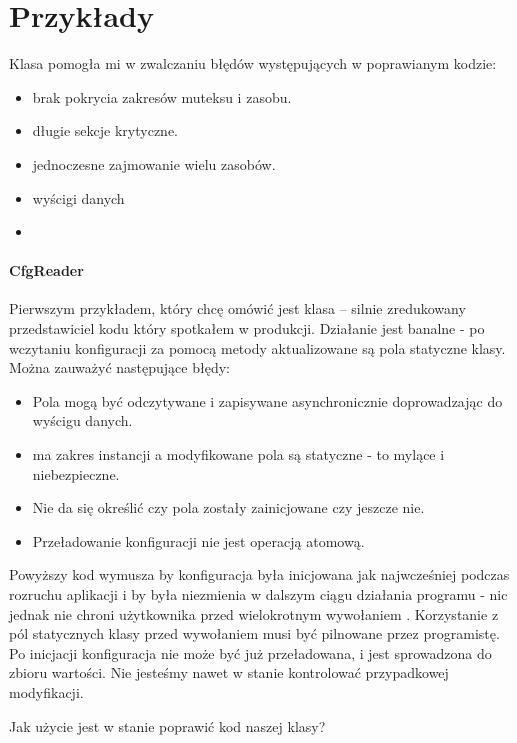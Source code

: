 \section{Przykłady}\label{sec:examples}
Klasa  pomogła mi w zwalczaniu błędów występujących w poprawianym kodzie:
\begin{itemize}
\item brak pokrycia zakresów muteksu i zasobu.
\item długie sekcje krytyczne.
\item jednoczesne zajmowanie wielu zasobów.
\item wyścigi danych
\item {}
\end{itemize}

\paragraph{CfgReader}
Pierwszym przykładem, który chcę omówić jest klasa  -- silnie zredukowany przedstawiciel kodu który spotkałem w produkcji. Działanie jest banalne - po wczytaniu konfiguracji za pomocą metody  aktualizowane są pola statyczne klasy.
Można zauważyć następujące błędy:
\begin{itemize}
\item Pola mogą być odczytywane i zapisywane asynchronicznie doprowadzając do wyścigu danych.
\item {} ma zakres instancji a modyfikowane pola są statyczne - to mylące i niebezpieczne.
\item Nie da się określić czy pola zostały zainicjowane czy jeszcze nie.
\item Przeładowanie konfiguracji nie jest operacją atomową.
\end{itemize}
Powyższy kod wymusza by konfiguracja była inicjowana jak najwcześniej podczas rozruchu aplikacji i by była niezmienia w dalszym ciągu działania programu - nic jednak nie chroni użytkownika przed wielokrotnym wywołaniem . Korzystanie z pól statycznych klasy przed wywołaniem  musi być pilnowane przez programistę. Po inicjacji konfiguracja nie może być już przeładowana, i jest sprowadzona do zbioru wartości. Nie jesteśmy nawet w stanie kontrolować przypadkowej modyfikacji.

Jak użycie  jest w stanie poprawić kod naszej klasy? 


